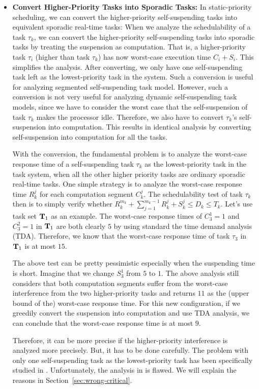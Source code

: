 \begin{itemize}
\item {\bf Convert Higher-Priority Tasks into Sporadic Tasks:} In static-priority scheduling, we can convert the higher-priority self-suspending tasks into equivalent sporadic real-time tasks: When we analyze the schedulability of a task $\tau_k$, we can convert the higher-priority self-suspending tasks into sporadic tasks by treating the suspension as computation. That is, a higher-priority task $\tau_i$ (higher than task $\tau_k$) has now worst-case execution time $C_i+S_i$. This simplifies the analysis. After converting, we only have one self-suspending task left as the lowest-priority task in the system.  Such a conversion is useful for analyzing segmented self-suspending task model. However, such a conversion is not very useful for analyzing dynamic self-suspending task models, since we have to consider the worst case that the self-suspension of task $\tau_k$ makes the processor idle. Therefore, we also have to convert $\tau_k$'s self-suspension into computation. This results in identical analysis by converting self-suspension into computation for all the tasks. 

With the conversion, the fundamental problem is to analyze the worst-case response time of a self-suspending task $\tau_k$ as the lowest-priority task in the task system, when all the other higher priority tasks are ordinary sporadic real-time tasks. One simple strategy is to analyze the worst-case response time $R_k^j$ for each computation segment $C_k^j$. The schedulability test of task $\tau_k$ then is to simply verify whether $R_k^{m_k} + \sum_{j=1}^{m_k-1} R_k^j + S_k^j \leq D_k \leq T_k$. Let's use task set ${\bf T}_1$ as an example. The worst-case response times of $C_3^1=1$ and $C_3^2=1$ in ${\bf T}_1$ are both clearly $5$ by using standard the time demand analysis (TDA). Therefore, we know that the worst-case response time of task $\tau_3$ in ${\bf T}_1$ is at most $15$.

The above test can be pretty pessimistic especially when the suspending time is short. Imagine that we change $S_3^1$ from $5$ to $1$. The above analysis still considers that both computation segments suffer from the worst-case interference from the two higher-priority tasks and returns $11$ as the (upper bound of the) worst-case response time. For this new configuration, if we greedily convert the suspension into computation and use TDA analysis, we can conclude that the worst-case response time is at most $9$. 

Therefore, it can be more precise if the higher-priority interference is analyzed more precisely. But, it has to be done carefully.
The problem with only one self-suspending task as the lowest-priority task has been specifically studied in \cite{LR:rtas10,ecrts15nelissen}. Unfortunately, the analysis in \cite{LR:rtas10} is flawed. We will explain the reasons in Section~\ref{sec:wrong-critical}.





\end{itemize}
